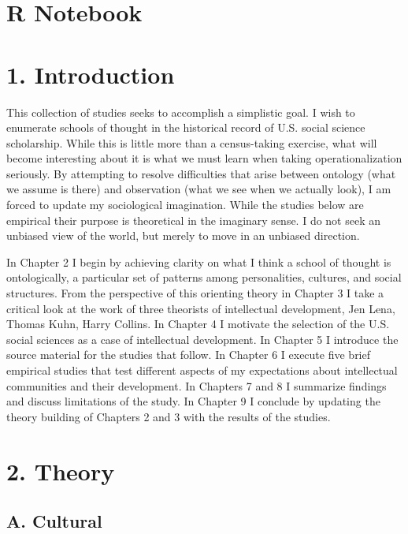 \section{R Notebook}\label{r-notebook}

\section{1. Introduction}\label{introduction}

This collection of studies seeks to accomplish a simplistic goal. I wish
to enumerate schools of thought in the historical record of U.S. social
science scholarship. While this is little more than a census-taking
exercise, what will become interesting about it is what we must learn
when taking operationalization seriously. By attempting to resolve
difficulties that arise between ontology (what we assume is there) and
observation (what we see when we actually look), I am forced to update
my sociological imagination. While the studies below are empirical their
purpose is theoretical in the imaginary sense. I do not seek an unbiased
view of the world, but merely to move in an unbiased direction.

In Chapter 2 I begin by achieving clarity on what I think a school of
thought is ontologically, a particular set of patterns among
personalities, cultures, and social structures. From the perspective of
this orienting theory in Chapter 3 I take a critical look at the work of
three theorists of intellectual development, Jen Lena, Thomas Kuhn,
Harry Collins. In Chapter 4 I motivate the selection of the U.S. social
sciences as a case of intellectual development. In Chapter 5 I introduce
the source material for the studies that follow. In Chapter 6 I execute
five brief empirical studies that test different aspects of my
expectations about intellectual communities and their development. In
Chapters 7 and 8 I summarize findings and discuss limitations of the
study. In Chapter 9 I conclude by updating the theory building of
Chapters 2 and 3 with the results of the studies.

\section{2. Theory}\label{theory}

\subsection{A. Cultural}\label{a.-cultural}

